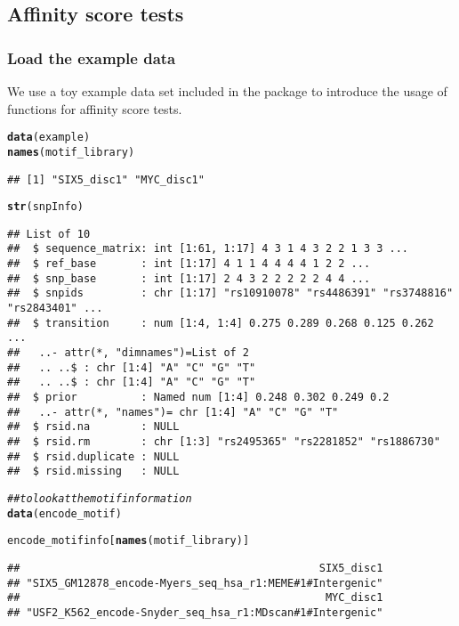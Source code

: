 \documentclass[a4paper,10pt]{article}\usepackage[]{graphicx}\usepackage[]{color}
\makeatletter
\newcommand{\hlcom}[1]{\textcolor[rgb]{0.678,0.584,0.686}{\textit{#1}}}%
\newcommand{\hlstd}[1]{\textcolor[rgb]{0.345,0.345,0.345}{#1}}%
\newcommand{\hlkwd}[1]{\textcolor[rgb]{0.737,0.353,0.396}{\textbf{#1}}}%
\newenvironment{kframe}{%
 \def\at@end@of@kframe{}%
 \ifinner\ifhmode%
  \def\at@end@of@kframe{\end{minipage}}%
  \begin{minipage}{\columnwidth}%
 \fi\fi%
 \def\FrameCommand##1{\hskip\@totalleftmargin \hskip-\fboxsep
 \colorbox{shadecolor}{##1}\hskip-\fboxsep
     \hskip-\linewidth \hskip-\@totalleftmargin \hskip\columnwidth}%
 \MakeFramed {\advance\hsize-\width
   \@totalleftmargin\z@ \linewidth\hsize
   \@setminipage}}%
 {\par\unskip\endMakeFramed%
 \at@end@of@kframe}
\newenvironment{knitrout}{}{} %
\makeatother
\begin{document}
\subsection{Affinity score tests}

\subsubsection{Load the example data}

We use a toy example data set included in the package to introduce the usage of functions for affinity score tests.

\begin{knitrout}
\color{fgcolor}\begin{kframe}
\begin{alltt}
\hlkwd{data}\hlstd{(example)}
\hlkwd{names}\hlstd{(motif_library)}
\end{alltt}
\begin{verbatim}
## [1] "SIX5_disc1" "MYC_disc1"
\end{verbatim}
\begin{alltt}
\hlkwd{str}\hlstd{(snpInfo)}
\end{alltt}
\begin{verbatim}
## List of 10
##  $ sequence_matrix: int [1:61, 1:17] 4 3 1 4 3 2 2 1 3 3 ...
##  $ ref_base       : int [1:17] 4 1 1 4 4 4 4 1 2 2 ...
##  $ snp_base       : int [1:17] 2 4 3 2 2 2 2 2 4 4 ...
##  $ snpids         : chr [1:17] "rs10910078" "rs4486391" "rs3748816" "rs2843401" ...
##  $ transition     : num [1:4, 1:4] 0.275 0.289 0.268 0.125 0.262 ...
##   ..- attr(*, "dimnames")=List of 2
##   .. ..$ : chr [1:4] "A" "C" "G" "T"
##   .. ..$ : chr [1:4] "A" "C" "G" "T"
##  $ prior          : Named num [1:4] 0.248 0.302 0.249 0.2
##   ..- attr(*, "names")= chr [1:4] "A" "C" "G" "T"
##  $ rsid.na        : NULL
##  $ rsid.rm        : chr [1:3] "rs2495365" "rs2281852" "rs1886730"
##  $ rsid.duplicate : NULL
##  $ rsid.missing   : NULL
\end{verbatim}
\begin{alltt}
\hlcom{## to look at the motif information}
\hlkwd{data}\hlstd{(encode_motif)}
\end{alltt}


{\ttfamily\noindent\color{warningcolor}{\#\# Warning in data(encode\_motif): data set 'encode\_motif' not found}}\begin{alltt}
\hlstd{encode_motifinfo[}\hlkwd{names}\hlstd{(motif_library)]}
\end{alltt}
\begin{verbatim}
##                                               SIX5_disc1 
## "SIX5_GM12878_encode-Myers_seq_hsa_r1:MEME#1#Intergenic" 
##                                                MYC_disc1 
## "USF2_K562_encode-Snyder_seq_hsa_r1:MDscan#1#Intergenic"
\end{verbatim}
\end{kframe}
\end{knitrout}
\end{document}
